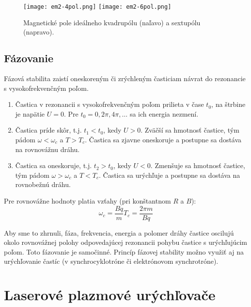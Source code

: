\documentclass[../../main.tex]{subfiles}
\begin{document}
\begin{figure}[h]
\centering
\texttt{[image: em2-4pol.png]}
\texttt{[image: em2-6pol.png]}
\caption{Magnetické pole ideálneho kvadrupólu (naľavo) a sextupólu (napravo).}
\end{figure}

\subsection{Fázovanie}

Fázová stabilita zaistí oneskoreným či zrýchleným časticiam návrat do rezonancie s vysokofrekvenčným poľom.

\begin{enumerate}
\item Častica v rezonancii s vysokofrekvenčným poľom prilieta v čase $t_0$, na štrbine je napätie $U=0$. Pre $t_0=0,2\pi,4\pi,\ldots$ sa ich energia nezmení.
\item Častica príde skôr, t.j. $t_1<t_0$, kedy $U>0$. Zväčší sa hmotnosť častice, tým pádom $\omega<\omega_c$ a $T>T_c$. Častica sa zjavne oneskoruje a postupne sa dostáva na rovnovážnu dráhu.
\item Častica sa oneskoruje, t.j. $t_2>t_0$, kedy $U<0$. Zmenšuje sa hmotnosť častice, tým pádom $\omega>\omega_c$ a $T<T_c$. Častica sa urýchľuje a postupne sa dostáva na rovnobežnú dráhu.
\end{enumerate}

Pre rovnovážne hodnoty platia vzťahy (pri konštantnom $R$ a $B$):
\begin{subequations}
\begin{equation}
\omega_c=\dfrac{Bq}{m}
\end{equation}
\begin{equation}
T_c=\dfrac{2\pi m}{Bq}
\end{equation}
\end{subequations}

Aby sme to zhrnuli, fáza, frekvencia, energia a polomer dráhy častice oscilujú okolo rovnovážnej polohy odpovedajúcej rezonancii pohybu častice s urýchľujúcim poľom. Toto fázovanie je samočinné. Princíp fázovej stability možno využiť aj na urýchľovanie častíc (v synchrocyklotróne či elektrónovom synchrotróne).

\section{Laserové plazmové urýchľovače}
\end{document}
